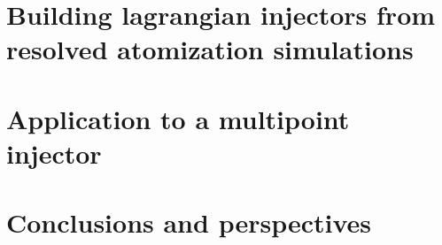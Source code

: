 \documentclass[twoside]{report}
\begin{document}

\newpage





\part{Building lagrangian injectors from resolved atomization simulations}

\newpage 

%
\newpage

\newpage

\newpage

\part{Application to a multipoint injector}

\newpage 

%
\newpage

%
\newpage
%

\newpage


\newpage


\part{Conclusions and perspectives}



\fancyhead[LO]{}
\nocite{*}


\newpage

\begin{appendices}

\newpage
\newpage

\newpage

\newpage
\end{appendices}
\end{document}
